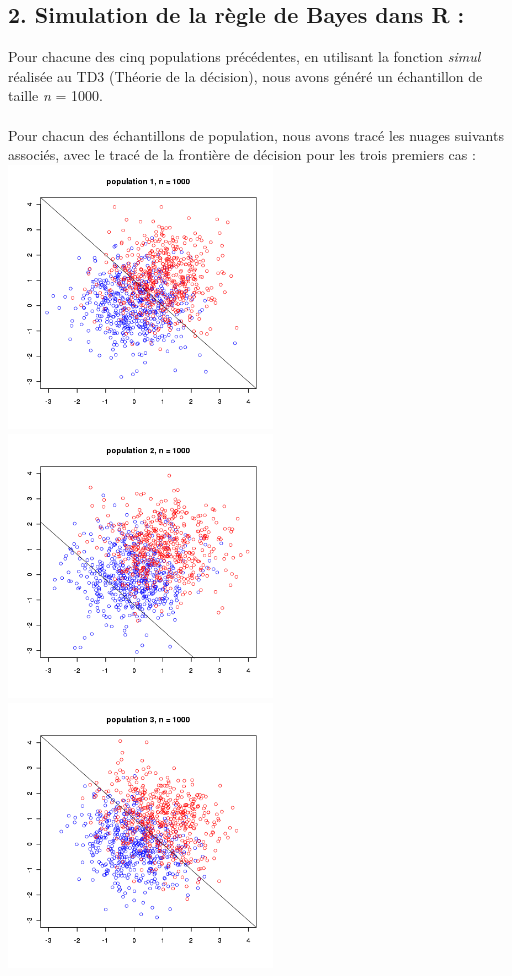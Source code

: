 \documentclass[a4paper, 10pt]{article}
\begin{document}
\newpage
\subsection*{2. Simulation de la règle de Bayes dans R :}
Pour chacune des cinq populations précédentes, en utilisant la fonction \textit{simul} réalisée au TD3 (Théorie de la décision),
nous avons généré un échantillon de taille \textit{n} = 1000.\\ \\
Pour chacun des échantillons de population, nous avons tracé les nuages suivants associés,
avec le tracé de la frontière de décision pour les trois premiers cas :\\
\includegraphics[height = 7cm, width = 7cm]{plots/exo1_simul_1.png}
\includegraphics[height = 7cm, width = 7cm]{plots/exo1_simul_2.png}\\
\includegraphics[height = 7cm, width = 7cm]{plots/exo1_simul_3.png}
\end{document}

